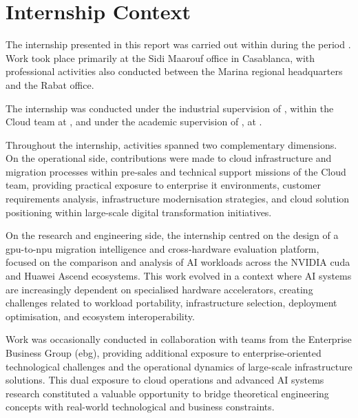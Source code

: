 
\section{Internship Context}
\label{sec:internship-context}

The internship presented in this report was carried out within \CompanyName{}
during the period \InternshipPeriod{}. Work took place primarily at the Sidi
Maarouf office in Casablanca, with professional activities also conducted
between the Marina regional headquarters and the Rabat office.

The internship was conducted under the industrial supervision of
\IndustrialSupervisorName{}, \IndustrialSupervisorTitle{} within the Cloud
team at \CompanyName{}, and under the academic supervision of
\AcademicSupervisorName{}, \AcademicSupervisorTitle{} at
\AcademicSupervisorInst{}.

Throughout the internship, activities spanned two complementary dimensions.
On the operational side, contributions were made to cloud infrastructure and
migration processes within pre-sales and technical support missions of the
Cloud team, providing practical exposure to enterprise \acrshort{it}
environments, customer requirements analysis, infrastructure modernisation
strategies, and cloud solution positioning within large-scale digital
transformation initiatives.

On the research and engineering side, the internship centred on the design of
a \acrshort{gpu}-to-\acrshort{npu} migration intelligence and cross-hardware
evaluation platform, focused on the comparison and analysis of AI workloads
across the NVIDIA \acrshort{cuda} and Huawei Ascend ecosystems. This work
evolved in a context where AI systems are increasingly dependent on specialised
hardware accelerators, creating challenges related to workload portability,
infrastructure selection, deployment optimisation, and ecosystem
interoperability.

Work was occasionally conducted in collaboration with teams from the Enterprise
Business Group (\acrshort{ebg}), providing additional exposure to
enterprise-oriented technological challenges and the operational dynamics of
large-scale infrastructure solutions. This dual exposure to cloud operations
and advanced AI systems research constituted a valuable opportunity to bridge
theoretical engineering concepts with real-world technological and business
constraints.
